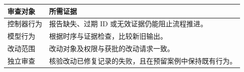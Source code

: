 \begin{tabular}{@{}P{4.0cm}P{8.5cm}@{}}
\toprule
\textbf{审查对象} & \textbf{所需证据} \\
\midrule
控制器行为 & 报告缺失、过期 ID 或无效证据仍能阻止流程推进。 \\
模型行为 & 根据时序与证据检查，比较新旧输出。 \\
改动范围 & 改动对象及权限与获批的改动请求一致。 \\
独立审查 & 核验改动已修复记录的失败，且在预留案例中保持既有行为。 \\
\bottomrule
\end{tabular}
